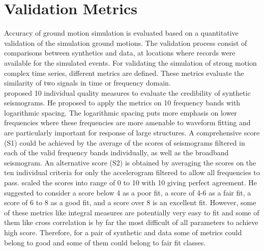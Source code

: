 
\section{Validation Metrics} \label{validation_metrics}

Accuracy of ground motion simulation is evaluated based on a quantitative validation of the simulation ground motions. The validation process consist of comparisons between synthetics and data, at locations where records were available for the simulated events. For validating the simulation of strong motion complex time series, different metrics are defined. These metrics evaluate the similarity of two signals in time or frequency domain. \\
\citet{Anderson_2004_Proc} proposed 10 individual quality measures to evaluate the credibility of synthetic seismograms.  He proposed to apply the metrics on 10 frequency bands with logarithmic spacing. The logarithmic spacing puts more emphasis on lower frequencies where these frequencies are more amenable to waveform fitting and are particularly important for response of large structures. A comprehensive score (S1) could be achieved by the average of the scores of seismograms filtered in each of the valid frequency bands individually, as well as the broadband seismogram. An alternative score (S2) is obtained by averaging the scores on the ten individual criteria for only the accelerogram filtered to allow all frequencies to pass. \citet{Anderson_2004_Proc} scaled the scores into range of 0 to 10 with 10 giving perfect agreement. He suggested to consider a score below 4 as a poor fit, a score of 4-6 as a fair fit, a score of 6 to 8 as a good fit, and a score over 8 is an excellent fit. However, some of these metrics like integral measures are potentially very easy to fit and some of them like cross correlation is by far the most difficult of all parameters to achieve high score. Therefore, for a pair of synthetic and data some of metrics could belong to good and some of them could belong to fair fit classes.\\

